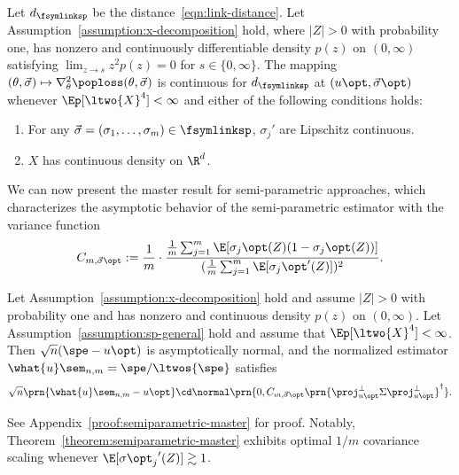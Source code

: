 \begin{lemma} \label{lem:d-continuity-guarantees}
  Let $d_{\fsymlinksp}$ be the distance~\eqref{eqn:link-distance}. Let
  Assumption~\ref{assumption:x-decomposition} hold, where $|Z| > 0$ with
  probability one, has nonzero and continuously differentiable density
  $p(z)$ on $(0, \infty)$ satisfying $\lim_{z \to s} z^2 p(z) = 0$ for $s
  \in \{0, \infty\}$. The mapping $(\theta, \vec{\sigma}) \mapsto
  \nabla_\theta^2 \poploss(\theta, \vec{\sigma})$ is continuous for
  $d_{\fsymlinksp}$ at $(u\opt, \vec{\sigma}\opt)$ whenever $\Ep [\ltwo{X}^4] <
  \infty$ and either of the following conditions holds:
  \begin{enumerate}[leftmargin=2em,label=(C.\arabic*)]
  \item For any  $\vec{\sigma} = (\sigma_1, \ldots, \sigma_m) \in \fsymlinksp$, $\sigma_j'$ are Lipschitz continuous.
  \item $X$ has continuous density on $\R^d$.
  \end{enumerate}
\end{lemma}
We can now present the master result for semi-parametric
approaches, which characterizes the asymptotic behavior of the
semi-parametric estimator with the variance function
\begin{align*}
  C_{m, \vec{\sigma}\opt} := \frac{1}{m} \cdot
  \frac{\frac{1}{m} \sum_{j = 1}^m \E[\sigma_j\opt(Z) (1 - \sigma_j\opt(Z))]}{
    (\frac{1}{m} \sum_{j = 1}^m
    \E[{\sigma_j\opt}'(Z)])^2}.
\end{align*} 
\begin{theorem}
  \label{theorem:semiparametric-master}
  Let Assumption~\ref{assumption:x-decomposition} hold and assume $|Z| >
  0$ with probability one and has nonzero and continuous density $p(z)$ on
  $(0, \infty)$.  Let Assumption~\ref{assumption:sp-general} hold and assume
  that $\Ep [\ltwo{X}^4] < \infty$.  Then $\sqrt{n}(\spe - u\opt)$ is
  asymptotically normal, and the normalized estimator $\what{u}\sem_{n,m} =
  \spe / \ltwos{\spe}$ satisfies
	\begin{equation*}
		\sqrt{n} \prn{\what{u}\sem_{n,m} - u\opt}
		\cd \normal\prn{0, 	C_{m, \vec{\sigma}\opt}
			\prn{\proj_{u\opt}^\perp \Sigma \proj_{u\opt}^\perp}^\dagger}.
	\end{equation*}
\end{theorem}
\noindent
See Appendix~\ref{proof:semiparametric-master} for proof.
Notably, Theorem~\ref{theorem:semiparametric-master} exhibits optimal
$1/m$ covariance scaling whenever $\E[{\sigma\opt_j}'(Z)] \gtrsim 1$.


